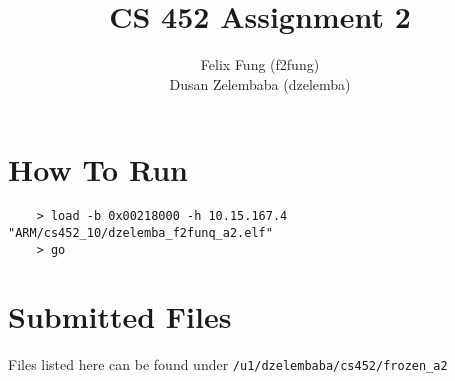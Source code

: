 \documentclass[letterpaper]{article}
\begin{document}
\title{CS 452 Assignment 2}
\author{Felix Fung (f2fung) \\ Dusan Zelembaba (dzelemba)}
\maketitle

\section{How To Run}
\begin{verbatim}
	> load -b 0x00218000 -h 10.15.167.4 "ARM/cs452_10/dzelemba_f2funq_a2.elf"
	> go
\end{verbatim}

\section{Submitted Files}

Files listed here can be found under \verb!/u1/dzelembaba/cs452/frozen_a2!
\end{document}
